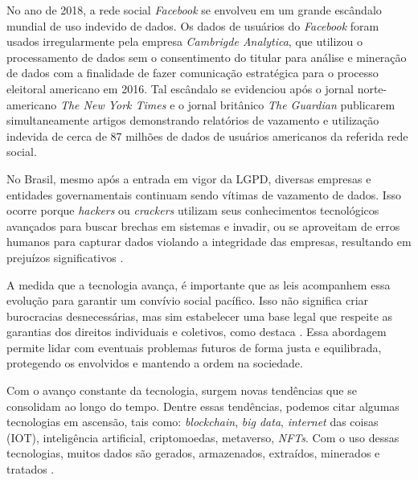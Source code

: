 \documentclass[
	12pt,				%
	openright,			%
	oneside,			%
	a4paper,			%
	english,			%
	french,				%
	spanish,			%
	brazil,				%
	]{abntex2}
\begin{document}
No ano de 2018, a rede social \textit{Facebook} se envolveu em um grande escândalo mundial de uso indevido de dados. Os  dados de usuários do \textit{Facebook}  foram usados irregularmente pela empresa \textit{Cambrigde Analytica}, que utilizou o processamento de dados sem o consentimento do titular para análise e mineração de dados com a finalidade de fazer comunicação estratégica para o processo eleitoral americano em 2016.
Tal escândalo se evidenciou após o jornal norte-americano \textit{The New York Times} \cite{01-03-Rosenberg2018} e o jornal britânico \textit{The Guardian} \cite{01-04-Graham} publicarem simultaneamente artigos demonstrando relatórios de vazamento e utilização indevida de cerca de 87 milhões de dados de usuários americanos da referida rede social. 

No Brasil, mesmo após a entrada em vigor da LGPD, diversas empresas e entidades governamentais continuam sendo vítimas de vazamento de dados. Isso ocorre porque \textit{hackers} ou \textit{crackers} utilizam seus conhecimentos tecnológicos avançados para buscar brechas em sistemas e invadir, ou se aproveitam de erros humanos para capturar dados violando a integridade das empresas, resultando em prejuízos significativos \cite{02-01-Almeida2020}.

A medida que a tecnologia avança, é importante que as leis acompanhem essa evolução para garantir um convívio social pacífico. Isso não significa criar burocracias desnecessárias, mas sim estabelecer uma base legal que respeite as garantias dos direitos individuais e coletivos, como destaca . Essa abordagem permite lidar com eventuais problemas futuros de forma justa e equilibrada, protegendo os envolvidos e mantendo a ordem na sociedade.


Com o avanço constante da tecnologia, surgem novas tendências que se consolidam ao longo do tempo. Dentre essas tendências, podemos citar algumas tecnologias em ascensão, tais como: \textit{blockchain}, \textit{big data}, \textit{internet} das coisas (IOT), inteligência artificial, criptomoedas, metaverso, \textit{NFTs}. Com o uso dessas tecnologias, muitos dados são gerados, armazenados, extraídos, minerados e tratados \cite{02-01-Vainzof2020}.
\\
\\
\\
\end{document}
